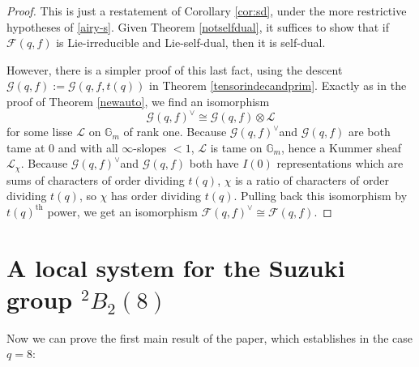 \documentclass[11pt]{amsart}
\theoremstyle{plain}
\theoremstyle{definition}
\numberwithin{thm}{section}
\numberwithin{equation}{thm}
\newcommand{\Hom}{{\rm Hom}}
\newcommand{\Swan}{\mathsf {Swan}}
\newcommand{\sF}{{\mathcal F}}
\newcommand{\sG}{{\mathcal G}}
\newcommand{\sL}{{\mathcal L}}
\newcommand{\G}{{\mathbb G}}
\newcommand{\Q}{{\mathbb Q}}
\newcommand{\0}{\emptyset}
\newcommand{\geo}{{\mathrm {geom}}}
\newcommand{\tw}[1]{{}^#1\!}
\begin{document}
\begin{proof}
This is just a restatement of Corollary \ref{cor:sd},
under the more restrictive hypotheses of \eqref{airy-s}.
Given Theorem \ref{notselfdual},
it suffices to show that if $\sF(q,f)$ is Lie-irreducible and Lie-self-dual, then it is self-dual.

However, there is a simpler proof of this last fact, using the descent $\sG(q,f):=\sG(q,f,t(q))$ in Theorem \ref{tensorindecandprim}. 
Exactly as in the proof of Theorem \ref{newauto}, we find an isomorphism
$$\sG(q,f)^\vee \cong \sG(q,f)\otimes \sL$$
for some lisse $\sL$ on $\G_m$ of rank one. Because $\sG(q,f)^\vee $and  $\sG(q,f)$ are both tame at $0$ and with all $\infty$-slopes $<1$,
$\sL$ is tame on $\G_m$, hence a Kummer sheaf $\sL_\chi$. Because  $\sG(q,f)^\vee $and  $\sG(q,f)$ both have $I(0)$ representations which are sums of characters of order dividing $t(q)$, $\chi$ is a ratio of characters of order  dividing $t(q)$, so $\chi$ has order dividing $t(q)$.
Pulling back this isomorphism by $t(q)^{\mathrm {th}}$ power, we get an isomorphism
$\sF(q,f)^\vee \cong \sF(q,f)$.
\end{proof}

\section{A local system for the Suzuki group $\tw2B_2(8)$}
Now we can prove the first main result of the paper, which establishes \cite[Conjecture 2.2]{Ka-ERS} in the case $q=8$:
\end{document}
